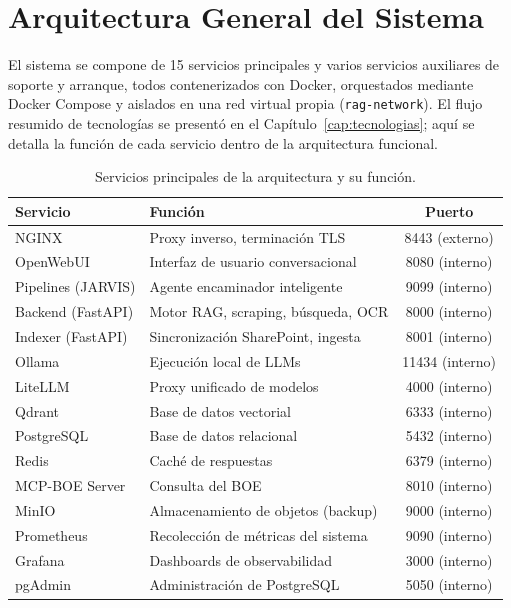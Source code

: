 \section{Arquitectura General del Sistema}
\label{sec:arquitectura-general}

El sistema se compone de 15 servicios principales y varios servicios auxiliares de soporte y arranque, todos contenerizados con Docker, orquestados mediante Docker Compose \cite{dockerCompose2026docs} y aislados en una red virtual propia (\texttt{rag-network}). El flujo resumido de tecnologías se presentó en el Capítulo~\ref{cap:tecnologias}; aquí se detalla la función de cada servicio dentro de la arquitectura funcional.

\begin{table}[H]
\centering
\caption{Servicios principales de la arquitectura y su función.}
\label{tab:servicios-completos}
\begin{tabular}{llc}
\toprule
\textbf{Servicio} & \textbf{Función} & \textbf{Puerto} \\
\midrule
NGINX              & Proxy inverso, terminación TLS        & 8443 (externo) \\
OpenWebUI          & Interfaz de usuario conversacional     & 8080 (interno) \\
Pipelines (JARVIS) & Agente encaminador inteligente         & 9099 (interno) \\
Backend (FastAPI)  & Motor RAG, scraping, búsqueda, OCR     & 8000 (interno) \\
Indexer (FastAPI)  & Sincronización SharePoint, ingesta     & 8001 (interno) \\
Ollama             & Ejecución local de LLMs                & 11434 (interno) \\
LiteLLM            & Proxy unificado de modelos             & 4000 (interno) \\
Qdrant             & Base de datos vectorial                & 6333 (interno) \\
PostgreSQL         & Base de datos relacional               & 5432 (interno) \\
Redis              & Caché de respuestas                    & 6379 (interno) \\
MCP-BOE Server     & Consulta del BOE                       & 8010 (interno) \\
MinIO              & Almacenamiento de objetos (backup)     & 9000 (interno) \\
Prometheus         & Recolección de métricas del sistema    & 9090 (interno) \\
Grafana            & Dashboards de observabilidad           & 3000 (interno) \\
pgAdmin            & Administración de PostgreSQL           & 5050 (interno) \\
\bottomrule
\end{tabular}
\end{table}

